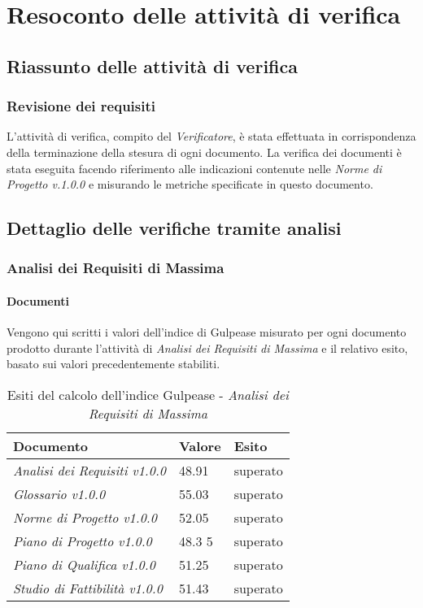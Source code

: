 \appendix
\section{Resoconto delle attività di verifica}
	\subsection{Riassunto delle attività di verifica}
	\subsubsection{Revisione dei requisiti}
	L'attività di verifica, compito del \emph{Verificatore}, è stata effettuata in corrispondenza della terminazione della stesura di ogni documento. La verifica dei documenti è stata eseguita facendo riferimento alle indicazioni contenute nelle \emph{Norme di Progetto v.1.0.0} e misurando le metriche specificate in questo documento.	
	
	\subsection{Dettaglio delle verifiche tramite analisi}
	\subsubsection{Analisi dei Requisiti di Massima}
	\paragraph{Documenti} \Spazio
	Vengono qui scritti i valori dell'indice di Gulpease misurato per ogni documento prodotto durante l'attività di \textit{Analisi dei Requisiti di Massima} e il relativo esito, basato sui valori precedentemente stabiliti.
	
	\begin{table}[H]
		\centering
		\begin{tabular}{|C{7cm}|C{2cm}|C{2cm}|}
			\hline
			\textbf{Documento} & \textbf{Valore} & \textbf{Esito}  \\
			\hline
			\textit{Analisi dei Requisiti v1.0.0} & 48.91 & superato \\
			\hline
			\textit{Glossario v1.0.0} & 55.03 & superato \\
			\hline
			\textit{Norme di Progetto v1.0.0} & 52.05 & superato \\
			\hline
			\textit{Piano di Progetto v1.0.0} & 48.3	5 & superato \\
			\hline
			\textit{Piano di Qualifica v1.0.0} & 51.25 & superato \\
			\hline
			\textit{Studio di Fattibilità v1.0.0} & 51.43 & superato \\
			\hline
			
		\end{tabular}
		\caption{Esiti del calcolo dell'indice Gulpease - \textit{Analisi dei Requisiti di Massima}}
	\end{table}
